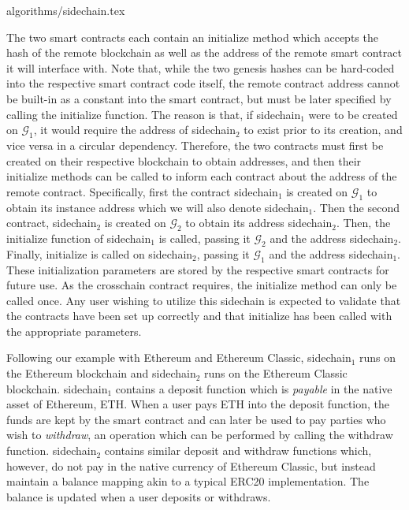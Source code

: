 {algorithms/sidechain.tex}

The two smart contracts each contain an \textsf{initialize} method which accepts
the hash of the remote blockchain as well as the address of the remote smart
contract it will interface with. Note that, while the two genesis hashes can be
hard-coded into the respective smart contract code itself, the remote contract
address cannot be built-in as a constant into the smart contract, but must be
later specified by calling the \textsf{initialize} function. The reason is that,
if \textsf{sidechain}$_1$ were to be created on $\mathcal{G}_1$, it would
require the address of \textsf{sidechain}$_2$ to exist prior to its creation,
and vice versa in a circular dependency. Therefore, the two contracts must first
be created on their respective blockchain to obtain addresses, and then their
\textsf{initialize} methods can be called to inform each contract about the
address of the remote contract. Specifically, first the contract
\textsf{sidechain}$_1$ is created on $\mathcal{G}_1$ to obtain its instance
address which we will also denote \textsf{sidechain}$_1$. Then the second
contract, \textsf{sidechain}$_2$ is created on $\mathcal{G}_2$ to obtain its
address \textsf{sidechain}$_2$. Then, the \textsf{initialize} function of
\textsf{sidechain}$_1$ is called, passing it $\mathcal{G}_2$ and the address
\textsf{sidechain}$_2$. Finally, \textsf{initialize} is called on
\textsf{sidechain}$_2$, passing it $\mathcal{G}_1$ and the address
\textsf{sidechain}$_1$. These initialization parameters are stored by the
respective smart contracts for future use. As the \textsf{crosschain} contract
requires, the \textsf{initialize} method can only be called once. Any user
wishing to utilize this sidechain is expected to validate that the contracts
have been set up correctly and that \textsf{initialize} has been called with the
appropriate parameters.

Following our example with Ethereum and Ethereum Classic, \textsf{sidechain}$_1$
runs on the Ethereum blockchain and \textsf{sidechain}$_2$ runs on the Ethereum
Classic blockchain. \textsf{sidechain}$_1$ contains a \textsf{deposit} function
which is \emph{payable} in the native asset of Ethereum, ETH. When a user pays
ETH into the \textsf{deposit} function, the funds are kept by the smart contract
and can later be used to pay parties who wish to \emph{withdraw}, an operation
which can be performed by calling the \textsf{withdraw} function.
\textsf{sidechain}$_2$ contains similar \textsf{deposit} and \textsf{withdraw}
functions which, however, do not pay in the native currency of Ethereum Classic,
but instead maintain a \textsf{balance} mapping akin to a typical ERC20
implementation. The balance is updated when a user deposits or withdraws.

